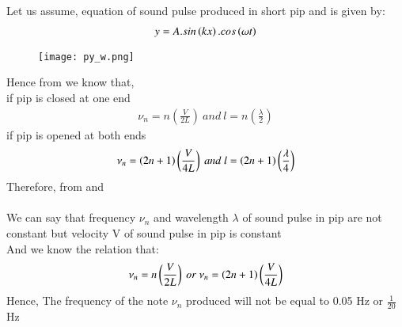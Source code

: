 \documentclass[beamer]{IEEEtran}
\theoremstyle{remark}
\begin{document}
 Let us assume, equation of sound pulse  produced in short pip and is given by:\\
\begin{align}
    \label{a1}
    y=A.sin\left(kx\right).cos\left(\omega t\right)
\end{align}
\begin{figure}[h]
    \centering
    \texttt{[image: py\_w.png]}
    \label{fig:enter-label}
\end{figure}

Hence from \brak{\ref{a1}} we know that,\\
if pip is closed at one end\\
\begin{align}
\label{a2}
\nu_n=n\left(\frac{V}{2L}\right)\ and\ l=n\left(\frac{\lambda}{2}\right)
\end{align}
if pip is opened at both ends\\
\begin{align}
\label{a3}
\nu_n=\brak{2n+1}\left(\frac{V}{4L}\right)\ and\ l=\brak{2n+1}\left(\frac{\lambda}{4}\right)
\end{align}
Therefore, from \brak{\ref{a2}} and \brak{\ref{a3}}\\\\
We can say that frequency $\nu_n$ and wavelength $\lambda$ of sound pulse in pip are not constant but velocity V of sound pulse in pip is constant\\

 And we know the relation that:
\begin{align}
    \label{a4}
    \nu_n=n\left(\frac{V}{2L}\right)\ or\ \nu_n=\brak{2n+1}\left(\frac{V}{4L}\right)
\end{align}
Hence, The frequency of the note $\nu_n$ produced will not be equal to 0.05 Hz or $\frac{1}{20}$ Hz 
\end{document}
